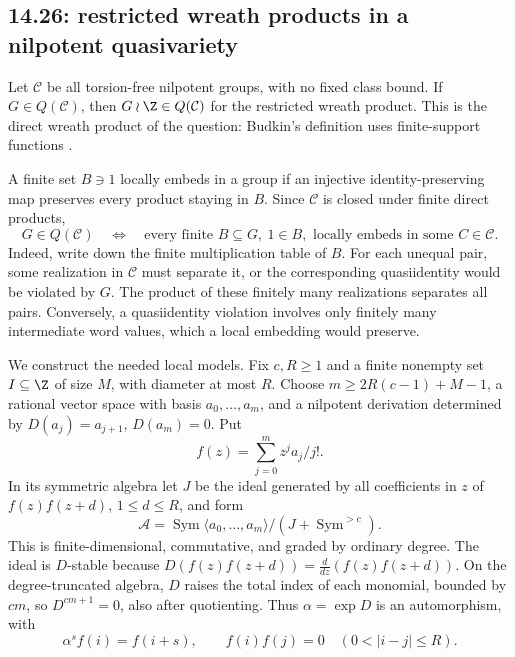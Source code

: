 \subsection{14.26: restricted wreath products in a nilpotent quasivariety}
\label{cand:14.26}
Let \(\mathcal C\) be all torsion-free nilpotent groups, with no fixed
class bound. If \(G\in Q(\mathcal C)\), then \(G\wr\Z\in Q(\mathcal C)\)
for the restricted wreath product. This is the direct wreath
product of the question: Budkin's definition uses finite-support
functions \cite[Section~1]{budkin-wreath}.

A finite set \(B\ni1\) locally embeds in a group if an injective
identity-preserving map preserves every product staying in \(B\).
Since \(\mathcal C\) is closed under finite direct products,
\[
 G\in Q(\mathcal C)
 \quad\Longleftrightarrow\quad
 \text{every finite }B\subseteq G,\ 1\in B,
 \text{ locally embeds in some }C\in\mathcal C.
\]
Indeed, write down the finite multiplication table of \(B\).
For each unequal pair, some realization in \(\mathcal C\) must separate
it, or the corresponding quasiidentity would be violated by \(G\).
The product of these finitely many realizations separates all pairs.
Conversely, a quasiidentity violation involves only finitely many
intermediate word values, which a local embedding would preserve.

We construct the needed local models. Fix \(c,R\ge1\) and a finite
nonempty set \(I\subseteq\Z\) of size \(M\), with diameter at most \(R\).
Choose \(m\ge2R(c-1)+M-1\), a rational vector space with basis
\(a_0,\ldots,a_m\), and a nilpotent derivation determined by
\(D(a_j)=a_{j+1}\), \(D(a_m)=0\). Put
\[
 f(z)=\sum_{j=0}^m z^ja_j/j!.
\]
In its symmetric algebra let \(J\) be the ideal generated by all
coefficients in \(z\) of \(f(z)f(z+d)\), \(1\le d\le R\), and form
\[
 \mathcal A=\operatorname{Sym}\langle a_0,\ldots,a_m\rangle/
       (J+\operatorname{Sym}^{>c}).
\]
This is finite-dimensional, commutative, and graded by ordinary degree.
The ideal is \(D\)-stable because
\(D(f(z)f(z+d))=\frac{d}{dz}(f(z)f(z+d))\).
On the degree-truncated algebra, \(D\) raises the total index of each
monomial, bounded by \(cm\), so \(D^{cm+1}=0\), also after quotienting.
Thus \(\alpha=\exp D\) is an automorphism, with
\[
 \alpha^sf(i)=f(i+s),\qquad
 f(i)f(j)=0\quad(0<|i-j|\le R).                    \tag{a}
\]

